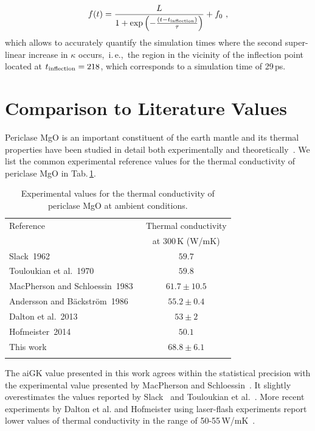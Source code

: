 \begin{align}
	f(t) 
		= \frac{L}{1 + \exp \left(-\frac{(t-t_{\rm inflection})}{\tau} \right)} + f_0~,
	\label{eq:imp.f_logistic}
\end{align}
which allows to accurately quantify the simulation times where the second super-linear increase in $\kappa$ occurs,~i.\,e.,~the region in the vicinity of the inflection point located at $t_{\rm inflection} = 218$, which corresponds to a simulation time of 29\,ps.

\section{Comparison to Literature Values}
\label{sec:mgo.experiments}
Periclase MgO is an important constituent of the earth mantle and its thermal properties have been studied in detail both experimentally and theoretically~\cite{charvat1957,slack1962,touloukian1970,macpherson1983,Koker2009,Stackhouse2010,tang2010,dekura2017}. We list the common experimental reference values for the thermal conductivity of periclase MgO in Tab.\,\ref{tab:exp.MgO}.
\begin{table}[ht]
  \centering
  \selectfont
  \begin{tabular}{lc}
    \toprule
    Reference & Thermal conductivity \\
    & at 300\,K (W/mK) \\
    \midrule
    Slack~1962~\cite{slack1962} & $59.7$ \\
    Touloukian et al.~1970~\cite{touloukian1970} & $59.8$ \\
    MacPherson and Schloessin~1983~\cite{macpherson1983} & $61.7 \pm 10.5$ \\
    Andersson and B\"ackstr\"om~1986~\cite{andersson1986} & $55.2 \pm 0.4$ \\
    Dalton et al.~2013~\cite{dalton2013} & $53 \pm 2$ \\
    Hofmeister~2014~\cite{hofmeister2014} & $50.1$ \\
    This work & $68.8 \pm 6.1$ \\
    \bottomrule
    \vspace{.5em}
  \end{tabular}
  \caption{Experimental values for the thermal conductivity of periclase MgO at ambient conditions. %
  }
  \label{tab:exp.MgO}
\end{table}
The aiGK value presented in this work agrees within the statistical precision with the experimental value presented by MacPherson and Schloessin~\cite{macpherson1983}. It slightly overestimates the values reported by Slack~\cite{slack1962} and Touloukian et al.~\cite{touloukian1970}. More recent experiments by Dalton et al. and Hofmeister using laser-flash experiments report lower values of thermal conductivity in the range of 50-55\,W/mK~\cite{dalton2013,hofmeister2014}.

